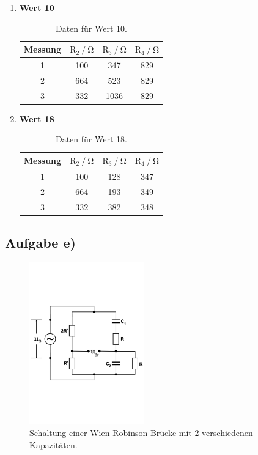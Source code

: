 \begin{enumerate}
\item \textbf{Wert 10}

\begin{table}
\centering
\begin{tabular}{c c c c }
\toprule
{Messung} &{$ \text{R}_2 \mathbin{/} \si{\ohm} $} & {$ \text{R}_3 \mathbin{/} \si{\ohm} $} & {$ \text{R}_4 \mathbin{/} \si{\ohm} $} \\
\midrule
1 & 100 & 347 & 829 \\
2 & 664 & 523 & 829 \\
3 & 332 & 1036 & 829 \\
\bottomrule
\end{tabular}
\caption{Daten für Wert 10.}
\label{tab:ad10}
\end{table}



\item \textbf{Wert 18}

\begin{table}
\centering
\begin{tabular}{c c c c }
\toprule
{Messung} & {$ \text{R}_2 \mathbin{/} \si{\ohm} $} & {$ \text{R}_3 \mathbin{/} \si{\ohm} $} & {$ \text{R}_4 \mathbin{/} \si{\ohm} $} \\
\midrule
1 & 100 & 128 & 347 \\
2 & 664 & 193 & 349 \\
3 & 332 & 382 & 348 \\
\bottomrule
\end{tabular}
\caption{Daten für Wert 18.}
\label{tab:ad18}
\end{table}

\end{enumerate}

\newpage
\subsection{Aufgabe e)}

\begin{figure}
            \centering
               \includegraphics[height=7cm]{wiene.pdf}
               \caption{Schaltung einer Wien-Robinson-Brücke mit 2 verschiedenen Kapazitäten.}
               \label{fig:wiene}
        \end{figure}


